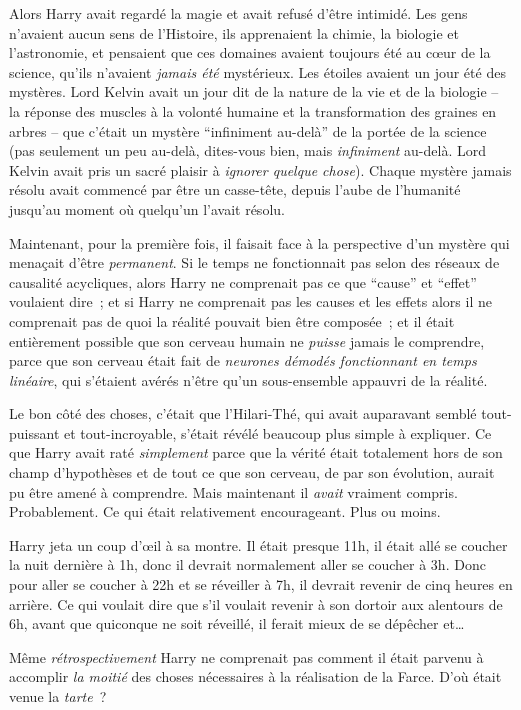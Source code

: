Alors Harry avait regardé la magie et avait refusé d'être intimidé. Les gens n'avaient aucun sens de l'Histoire, ils apprenaient la chimie, la biologie et l'astronomie, et pensaient que ces domaines avaient toujours été au cœur de la science, qu'ils n'avaient \emph{jamais été} mystérieux. Les étoiles avaient un jour été des mystères. Lord Kelvin avait un jour dit de la nature de la vie et de la biologie -- la réponse des muscles à la volonté humaine et la transformation des graines en arbres -- que c'était un mystère “infiniment au-delà” de la portée de la science (pas seulement un peu au-delà, dites-vous bien, mais \emph{infiniment} au-delà. Lord Kelvin avait pris un sacré plaisir à \emph{ignorer quelque chose}). Chaque mystère jamais résolu avait commencé par être un casse-tête, depuis l'aube de l'humanité jusqu'au moment où quelqu'un l'avait résolu.

Maintenant, pour la première fois, il faisait face à la perspective d'un mystère qui menaçait d'être \emph{permanent}. Si le temps ne fonctionnait pas selon des réseaux de causalité acycliques, alors Harry ne comprenait pas ce que “cause” et “effet” voulaient dire~; et si Harry ne comprenait pas les causes et les effets alors il ne comprenait pas de quoi la réalité pouvait bien être composée~; et il était entièrement possible que son cerveau humain ne \emph{puisse} jamais le comprendre, parce que son cerveau était fait de \emph{neurones démodés fonctionnant en temps linéaire}, qui s'étaient avérés n'être qu'un sous-ensemble appauvri de la réalité.

Le bon côté des choses, c'était que l'Hilari-Thé, qui avait auparavant semblé tout-puissant et tout-incroyable, s'était révélé beaucoup plus simple à expliquer. Ce que Harry avait raté \emph{simplement} parce que la vérité était totalement hors de son champ d'hypothèses et de tout ce que son cerveau, de par son évolution, aurait pu être amené à comprendre. Mais maintenant il \emph{avait} vraiment compris. Probablement. Ce qui était relativement encourageant. Plus ou moins.

Harry jeta un coup d'œil à sa montre. Il était presque 11h, il était allé se coucher la nuit dernière à 1h, donc il devrait normalement aller se coucher à 3h. Donc pour aller se coucher à 22h et se réveiller à 7h, il devrait revenir de cinq heures en arrière. Ce qui voulait dire que s'il voulait revenir à son dortoir aux alentours de 6h, avant que quiconque ne soit réveillé, il ferait mieux de se dépêcher et…

Même \emph{rétrospectivement} Harry ne comprenait pas comment il était parvenu à accomplir \emph{la moitié} des choses nécessaires à la réalisation de la Farce. D'où était venue la \emph{tarte}~?

